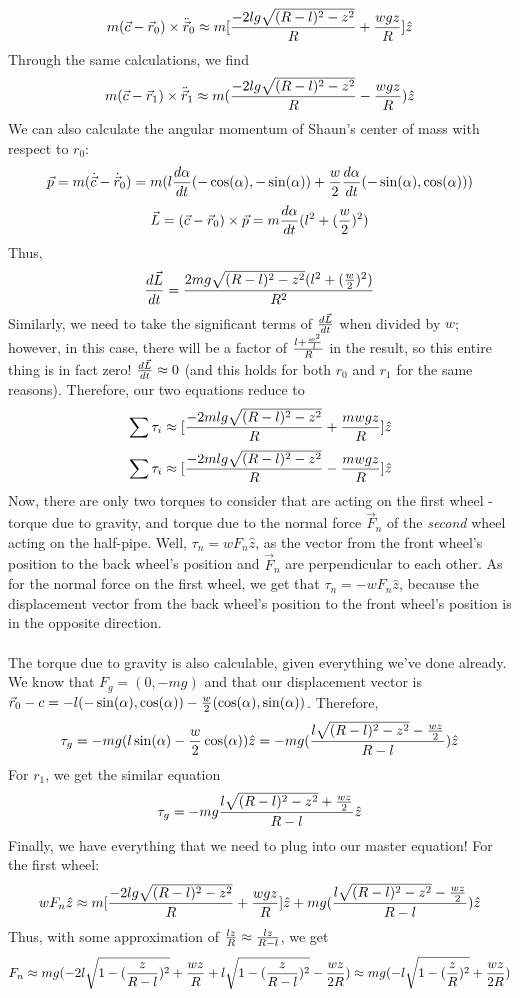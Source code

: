 $$m(\vec c-\vec r_0)\times \ddot {\vec r}_0\approx m[\frac{-2lg\sqrt{(R-l)^2-z^2}}{R}+\frac{wgz}{R}]\hat z$$
Through the same calculations, we find
$$m(\vec c-\vec r_1)\times \ddot{\vec r}_1\approx m(\frac{-2lg\sqrt{(R-l)^2-z^2}}{R}-\frac {wgz}R)\hat z$$
We can also calculate the angular momentum of Shaun's center of mass with respect to $r_0$:
$$\vec p=m(\dot{\vec c}-\dot{\vec r}_0)=m(l\frac{d\alpha}{dt}(-\cos(\alpha), -\sin(\alpha))+\frac w 2 \frac{d\alpha}{dt}(-\sin(\alpha), \cos(\alpha)))$$
$$\vec L=(\vec c-\vec r_0)\times \vec p=m\frac{d\alpha}{dt}(l^2+(\frac w 2)^2)$$
Thus, 
$$\frac{d\vec L}{dt}=\frac{2mg\sqrt{(R-l)^2-z^2}(l^2+(\frac w 2)^2)}{R^2}$$
Similarly, we need to take the significant terms of $\frac{d\vec L}{dt}$ when divided by $w$; however, in this case, there will be a factor of $\frac{l+\frac{w^2}{l}}{R}$ in the result, so this entire thing is in fact zero!  $\frac{d\vec L}{dt}\approx 0$ (and this holds for both $r_0$ and $r_1$ for the same reasons).  
Therefore, our two equations reduce to
$$\sum \tau_i\approx [\frac{-2mlg\sqrt{(R-l)^2-z^2}}{R}+\frac{mwgz}{R}]\hat z$$
$$\sum \tau_i\approx [\frac{-2mlg\sqrt{(R-l)^2-z^2}}{R}-\frac{mwgz}{R}]\hat z$$
Now, there are only two torques to consider that are acting on the first wheel - torque due to gravity, and torque due to the normal force $\vec F_n$ of the \textit{second} wheel acting on the half-pipe.  Well, $\tau_n=w F_n \hat z$, as the vector from the front wheel's position to the back wheel's position and $\vec F_n$ are perpendicular to each other.  As for the normal force on the first wheel, we get that $\tau_n=-w F_n \hat z$, because the displacement vector from the back wheel's position to the front wheel's position is in the opposite direction.
\\\\ The torque due to gravity is also calculable, given everything we've done already.  We know that $F_g=(0, -mg)$ and that our displacement vector is $\vec r_0-c=-l(-\sin(\alpha), \cos(\alpha))-\frac w 2(\cos(\alpha), \sin(\alpha))$.  Therefore, 
$$\tau_g=-mg(l\sin(\alpha)-\frac w 2 \cos(\alpha))\hat z=-mg(\frac{l\sqrt{(R-l)^2-z^2}-\frac {wz}{2}}{R-l})\hat z$$
For $r_1$, we get the similar equation
$$\tau_g=-mg\frac{l\sqrt{(R-l)^2-z^2}+\frac {wz}2}{R-l} \hat z$$
Finally, we have everything that we need to plug into our master equation!  For the first wheel:
$$w F_n \hat z\approx  m[\frac{-2lg\sqrt{(R-l)^2-z^2}}{R}+\frac{wgz}{R}]\hat z+mg(\frac{l\sqrt{(R-l)^2-z^2}-\frac {wz}{2}}{R-l})\hat z$$
Thus, with some approximation of $\frac {lz} R\approx \frac {lz}{R-l}$, we get
$$F_n\approx mg(-2l\sqrt{1-(\frac z {R-l})^2}+ \frac {wz}{R}+l\sqrt{1-(\frac z {R-l})^2}-\frac {wz}{2R})\approx mg(-l\sqrt{1-(\frac z R)^2}+\frac{wz}{2R})$$

